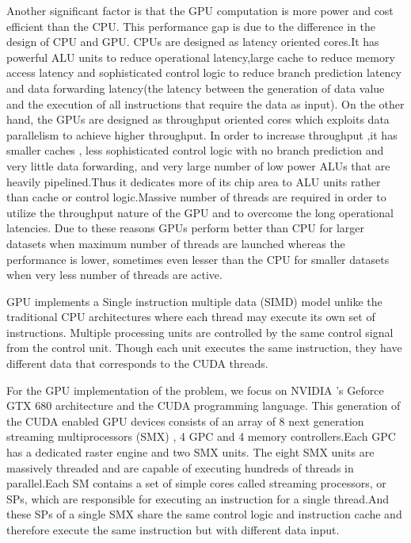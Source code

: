 \documentclass{article}
\begin{document}
 
 Another significant factor is that the GPU computation is more power and cost efficient than the CPU.
This performance gap is due to the difference in the design of CPU and GPU. 
CPUs are designed as latency oriented cores.It has powerful ALU units to reduce operational latency,large cache to reduce memory access latency and sophisticated control logic to reduce branch  prediction latency and data forwarding latency(the latency between the generation of data value and the execution of all instructions that require the data as input). On the other hand, the GPUs are designed as throughput oriented cores which exploits  data parallelism to achieve higher throughput. In order to increase throughput ,it has smaller caches , less sophisticated control logic with no branch prediction and very little data forwarding, and very large number of low power ALUs that are heavily pipelined.Thus it dedicates more of its chip area to ALU units rather than cache or control logic.Massive number of threads are required in order to utilize the throughput nature of the GPU and to overcome the long operational latencies. Due to these reasons GPUs perform better than CPU for larger datasets when maximum number of threads are launched whereas the performance is lower, sometimes even lesser than the CPU for smaller datasets when very less number of threads are active.
 
 
GPU implements a Single instruction multiple data (SIMD) model unlike the traditional CPU architectures where each thread may execute its own set of instructions. Multiple processing units are controlled by the same control signal from the control unit. Though each unit executes the same instruction, they have different data that corresponds to the CUDA threads.
 
For the GPU implementation of the problem, we focus on NVIDIA 's Geforce GTX 680 architecture and the CUDA programming language. This generation of the CUDA enabled GPU devices consists of an array of 8 next generation streaming multiprocessors (SMX) , 4 GPC and 4 memory controllers.Each GPC has a dedicated raster engine and two SMX units. The eight SMX units are massively threaded and are capable of executing hundreds of threads in parallel.Each SM contains a set of simple cores called streaming processors, or SPs, which are responsible for executing an instruction for a single thread.And these SPs of a single SMX share the same control logic and instruction cache and therefore execute the same instruction but with different data input.
\end{document}

